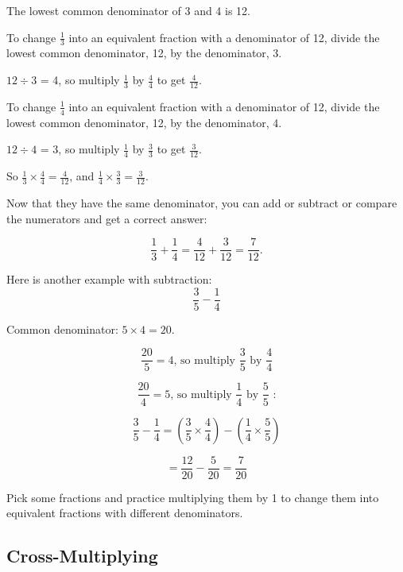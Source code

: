 \documentclass[16pt]{article}
\begin{document}
\begin{spacing}{1.25}
\begin{doublespace}
The lowest common denominator of 3 and 4 is 12.

To change $\frac{1}{3}$ into an equivalent fraction with a denominator of 12,
divide the lowest common denominator, 12, by the denominator, 3.

$12 \div 3$ = 4, so multiply $\frac{1}{3}$ by $\frac{4}{4}$ to get $\frac{4}{12}$.

To change $\frac{1}{4}$ into an equivalent fraction with a denominator of 12,
divide the lowest common denominator, 12, by the denominator, 4.

$12 \div 4$ = 3, so multiply $\frac{1}{4}$ by $\frac{3}{3}$ to get $\frac{3}{12}$.

So $\frac{1}{3} \times \frac{4}{4} = \frac{4}{12}$, and $\frac{1}{4} \times \frac{3}{3} = \frac{3}{12}$.

Now that they have the same denominator, you can add or subtract or compare the numerators and get a correct answer:

$$\frac{1}{3} + \frac{1}{4} = \frac{4}{12} + \frac{3}{12} = \frac{7}{12}.$$
\end{doublespace}

\pagebreak

Here is another example with subtraction:
$$\frac{3}{5} - \frac{1}{4}$$

Common denominator: $5 \times 4 = 20$.

$$\frac{20}{5} = 4\text{, so multiply }\frac{3}{5} \text{ by }\frac{4}{4}$$

$$\frac{20}{4} = 5\text{, so multiply }\frac{1}{4}\text{ by }\frac{5}{5}\text{ :}$$

$$\frac{3}{5} - \frac{1}{4} = \left(\frac{3}{5} \times \frac{4}{4}\right) - \left(\frac{1}{4} \times \frac{5}{5}\right)$$

$$= \frac{12}{20} - \frac{5}{20} = \frac{7}{20}$$

\vspace{28pt}

Pick some fractions and practice multiplying them by 1 to change them into equivalent fractions with different denominators.

\newpage

\subsection*{Cross-Multiplying}


\end{spacing}
\end{document}
